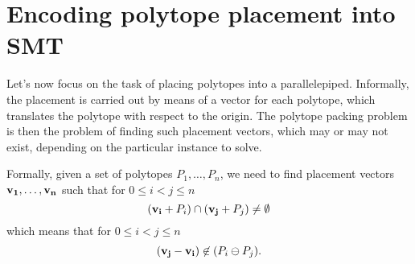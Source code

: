 \section{Encoding polytope placement into SMT}

Let's now focus on the task of placing polytopes into a parallelepiped. 
Informally, the placement is carried out by means of a vector 
for each polytope, which translates the polytope with respect to the
origin. The polytope packing problem is then the problem of finding
such placement vectors, which may or may not exist, depending on the
particular instance to solve.

Formally, given a set of polytopes $P_1, \ldots, P_n$, we need to find
placement vectors $\mathbf{v_1}, \ldots, \mathbf{v_n}$ such that for $0\leq i<j \leq n$
$$(\mathbf{v_i}+P_i) \cap (\mathbf{v_j}+P_j) \not= \emptyset$$ 
which means that for $0 \leq i<j \leq n$
$$(\mathbf{v_j} - \mathbf{v_i}) \not\in (P_i \ominus P_j).$$

